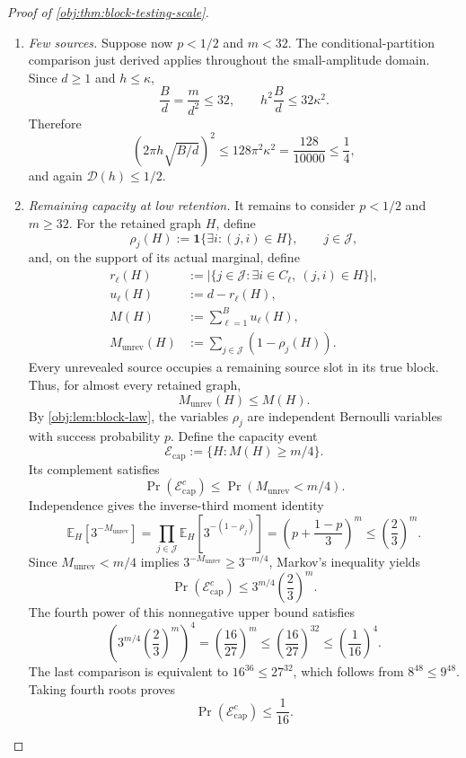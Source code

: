 \begin{proof}[Proof of \cref{obj:thm:block-testing-scale}]
\begin{enumerate}
Since \(p>0\), the definition of \(s\) also gives
\[
h\sqrt{mp}\le\kappa d,
\qquad
h^2mp\le\kappa^2d^2.
\]
Using \(p\ge1/2\) and \(m=Bd\), we obtain
\[
h^2\frac Bd
=\frac{h^2m}{d^2}
\le2\kappa^2.
\]
The required constant calibration is
\[
\left(2\pi h\sqrt{B/d}\right)^2
\le8\pi^2\kappa^2
=\frac8{10000}
\le\frac14.
\]
The quantity being squared is nonnegative, so \(\mathcal D(h)\le1/2\).

\item \textit{Few sources.}
Suppose now \(p<1/2\) and \(m<32\). The conditional-partition comparison just derived applies throughout the small-amplitude domain. Since \(d\ge1\) and \(h\le\kappa\),
\[
\frac Bd=\frac{m}{d^2}\le32,
\qquad
h^2\frac Bd\le32\kappa^2.
\]
Therefore
\[
\left(2\pi h\sqrt{B/d}\right)^2
\le128\pi^2\kappa^2
=\frac{128}{10000}
\le\frac14,
\]
and again \(\mathcal D(h)\le1/2\).

\item \textit{Remaining capacity at low retention.}
It remains to consider \(p<1/2\) and \(m\ge32\). For the retained graph \(H\), define
\[
\rho_j(H):=\mathbf1\{\exists i:(j,i)\in H\},
\qquad j\in\mathcal J,
\]
and, on the support of its actual marginal, define
\[
\begin{aligned}
r_\ell(H)&:=
\bigl|\{j\in\mathcal J:\exists i\in C_\ell,\ (j,i)\in H\}\bigr|,\\
u_\ell(H)&:=d-r_\ell(H),\\
M(H)&:=\sum_{\ell=1}^{B}u_\ell(H),\\
M_{\mathrm{unrev}}(H)&:=\sum_{j\in\mathcal J}(1-\rho_j(H)).
\end{aligned}
\]
Every unrevealed source occupies a remaining source slot in its true block. Thus, for almost every retained graph,
\[
M_{\mathrm{unrev}}(H)\le M(H).
\]
By \cref{obj:lem:block-law}, the variables \(\rho_j\) are independent Bernoulli variables with success probability \(p\). Define the capacity event
\[
\mathcal E_{\mathrm{cap}}:=\{H:M(H)\ge m/4\}.
\]
Its complement satisfies
\[
\Pr(\mathcal E_{\mathrm{cap}}^c)
\le\Pr(M_{\mathrm{unrev}}<m/4).
\]
Independence gives the inverse-third moment identity
\[
\mathbb E_H[3^{-M_{\mathrm{unrev}}}]
=
\prod_{j\in\mathcal J}\mathbb E_H[3^{-(1-\rho_j)}]
=
\left(p+\frac{1-p}{3}\right)^m
\le\left(\frac23\right)^m.
\]
Since \(M_{\mathrm{unrev}}<m/4\) implies
\(3^{-M_{\mathrm{unrev}}}\ge3^{-m/4}\), Markov's inequality yields
\[
\Pr(\mathcal E_{\mathrm{cap}}^c)
\le
3^{m/4}\left(\frac23\right)^m.
\]
The fourth power of this nonnegative upper bound satisfies
\[
\left(3^{m/4}\left(\frac23\right)^m\right)^4
=
\left(\frac{16}{27}\right)^m
\le
\left(\frac{16}{27}\right)^{32}
\le
\left(\frac1{16}\right)^4.
\]
The last comparison is equivalent to
\(16^{36}\le27^{32}\), which follows from \(8^{48}\le9^{48}\). Taking fourth roots proves
\[
\Pr(\mathcal E_{\mathrm{cap}}^c)\le\frac1{16}.
\]


\end{enumerate}
\end{proof}
